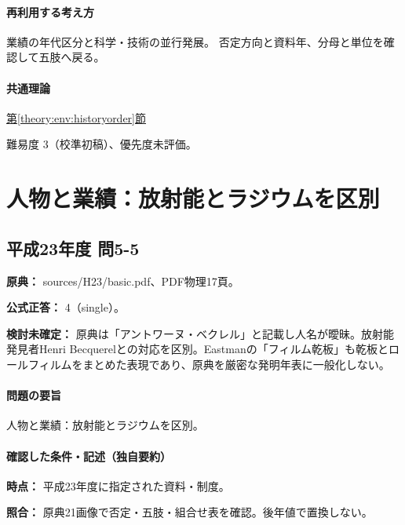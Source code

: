 \paragraph{再利用する考え方} 業績の年代区分と科学・技術の並行発展。 否定方向と資料年、分母と単位を確認して五肢へ戻る。

\paragraph{共通理論} \hyperref[theory:env:historyorder]{第\ref*{theory:env:historyorder}節}

\par 難易度 3（校準初稿）、優先度未評価。

\section{人物と業績：放射能とラジウムを区別}

\subsection{平成23年度 問5-5}
\label{q:h23-reg-basic-5-5}

\noindent\textbf{原典：} sources/H23/basic.pdf、PDF物理17頁。

\textbf{公式正答：} 4（single）。

\par\textbf{検討未確定：} 原典は「アントワーヌ・ベクレル」と記載し人名が曖昧。放射能発見者Henri Becquerelとの対応を区別。Eastmanの「フィルム乾板」も乾板とロールフィルムをまとめた表現であり、原典を厳密な発明年表に一般化しない。

\paragraph{問題の要旨} 人物と業績：放射能とラジウムを区別。

\paragraph{確認した条件・記述（独自要約）}\mbox{}\par

\noindent\textbf{時点：} 平成23年度に指定された資料・制度。\par

\noindent\textbf{照合：} 原典21画像で否定・五肢・組合せ表を確認。後年値で置換しない。\par

